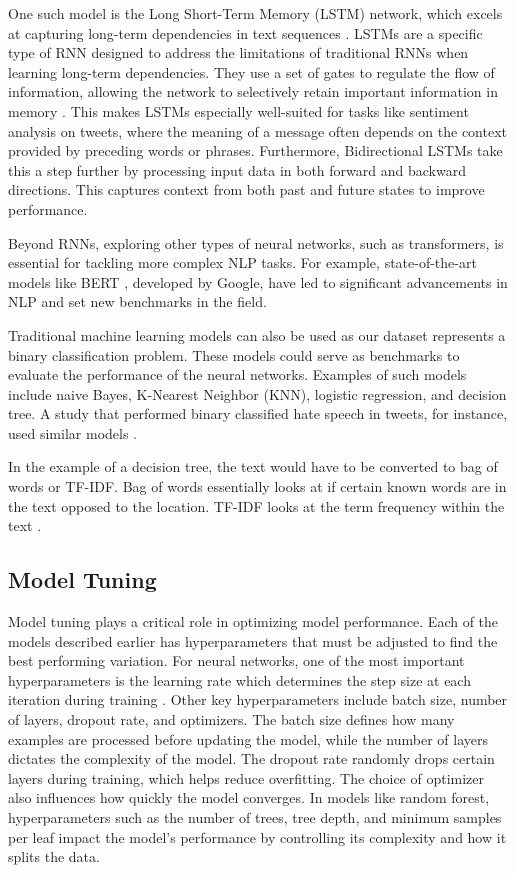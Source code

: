 \documentclass{article}
\newcommand{\tweets}{tweets}
\begin{document}
\begin{multicols}{2}
One such model is the Long Short-Term Memory (LSTM) network, which excels at capturing long-term dependencies in text sequences \cite{usha2021}. LSTMs are a specific type of RNN designed to address the limitations of traditional RNNs when learning long-term dependencies. They use a set of gates to regulate the flow of information, allowing the network to selectively retain important information in memory \cite{hochreiter1997long}. This makes LSTMs especially well-suited for tasks like sentiment analysis on \tweets, where the meaning of a message often depends on the context provided by preceding words or phrases. Furthermore, Bidirectional LSTMs take this a step further by processing input data in both forward and backward directions. This captures context from both past and future states to improve performance.

Beyond RNNs, exploring other types of neural networks, such as transformers, is essential for tackling more complex NLP tasks. For example, state-of-the-art models like BERT \cite{huggingface_bert}, developed by Google, have led to significant advancements in NLP and set new benchmarks in the field.

Traditional machine learning models can also be used as our dataset represents a binary classification problem. These models could serve as benchmarks to evaluate the performance of the neural networks. Examples of such models include naive Bayes, K-Nearest Neighbor (KNN), logistic regression, and decision tree. A study that performed binary classified hate speech in \tweets, for instance, used similar models \cite{akuma2022}. 

In the example of a decision tree, the text would have to be converted to bag of words or TF-IDF. Bag of words essentially looks at if certain known words are in the text opposed to the location. TF-IDF looks at the term frequency within the text \cite{hacohen2020influence}. 

\subsection{Model Tuning}

Model tuning plays a critical role in optimizing model performance. Each of the models described earlier has hyperparameters that must be adjusted to find the best performing variation. For neural networks, one of the most important hyperparameters is the learning rate which determines the step size at each iteration during training \cite{WU201926}. Other key hyperparameters include batch size, number of layers, dropout rate, and optimizers. The batch size defines how many examples are processed before updating the model, while the number of layers dictates the complexity of the model. The dropout rate randomly drops certain layers during training, which helps reduce overfitting. The choice of optimizer also influences how quickly the model converges. In models like random forest, hyperparameters such as the number of trees, tree depth, and minimum samples per leaf impact the model's performance by controlling its complexity and how it splits the data.


\end{multicols}
\end{document}
